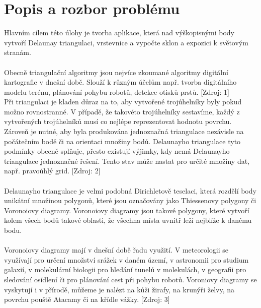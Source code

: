 \documentclass[a4paper, 12pt]{article}
\begin{document}
\section{Popis a rozbor problému}
Hlavním cílem této úlohy je tvorba aplikace, která nad výškopisnými body vytvoří Delaunay triangulaci, vrstevnice a vypočte sklon a expozici k světovým stranám.\\
\\
Obecně triangulační algoritmy jsou nejvíce zkoumané algoritmy digitální kartografie v dnešní době. Slouží k různým účelům např. tvorba digitálního modelu terénu, plánování pohybu robotů, detekce otisků prstů.  [Zdroj: 1]
\\
Při triangulaci je kladen důraz na to, aby vytvořené trojúhelníky byly pokud možno rovnostranné. V případě, že takovéto trojúhelníky sestavíme, každý z vytvořených trojúhelníků musí co nejlépe reprezentovat hodnotu povrchu. Zároveň je nutné, aby byla produkována jednoznačná triangulace nezávisle na počátečním bodě či na orientaci množiny bodů. Delaunayho triangulace tyto podmínky obecně splňuje, přesto existují výjimky, kdy nemá Delaunayho triangulace jednoznačné řešení. Tento stav může nastat pro určité množiny dat, např. pravoúhlý grid. [Zdroj: 2]\\
\\
Delaunayho triangulace je velmi podobná Dirichletově teselaci, která rozdělí body unikátní množinou polygonů, které jsou označovány jako Thiessenovy polygony či Voronoiovy diagramy. Voronoiovy diagramy jsou takové polygony, které vytvoří kolem všech bodů takové oblasti, že všechna místa uvnitř leží nejblíže k danému bodu. \\
\\
Voronoiovy diagramy mají v dnešní době řadu využití. V meteorologii se využívají pro určení množství srážek v daném území, v astronomii pro studium galaxií, v molekulární biologii pro hledání tunelů v molekulách, v geografii pro sledování osídlení či pro plánování cest při pohybu robotů. Voroniovy diagramy se vyskytují i v přírodě, můžeme je nalézt na kůži žirafy, na krunýři želvy, na povrchu pouště Atacamy či na křídle vážky. [Zdroj: 3]
\end{document}
